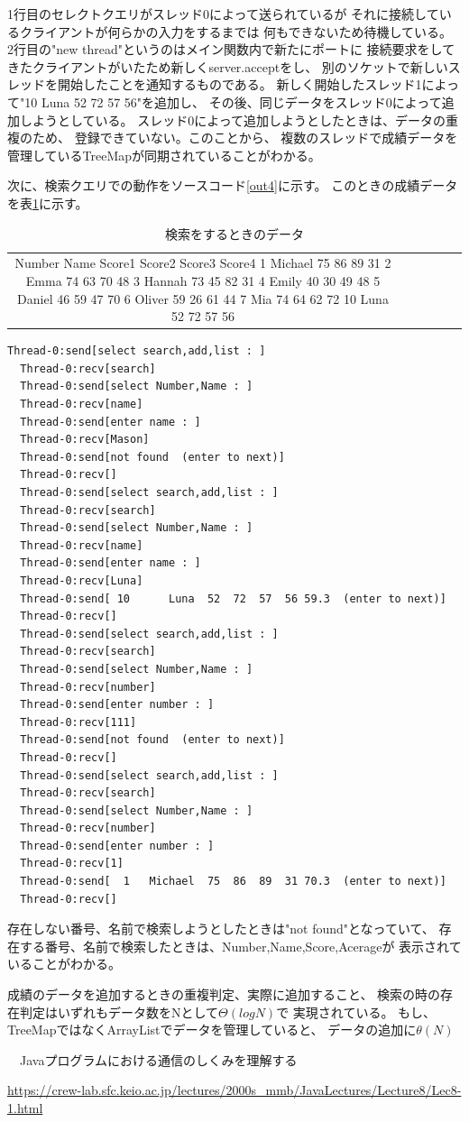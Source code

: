 \documentclass[dvipdfmx]{jsarticle}
\begin{document}
1行目のセレクトクエリがスレッド0によって送られているが
それに接続しているクライアントが何らかの入力をするまでは
何もできないため待機している。
2行目の"new thread"というのはメイン関数内で新たにポートに
接続要求をしてきたクライアントがいたため新しくserver.acceptをし、
別のソケットで新しいスレッドを開始したことを通知するものである。
新しく開始したスレッド1によって"10 Luna 52 72 57 56"を追加し、
その後、同じデータをスレッド0によって追加しようとしている。
スレッド0によって追加しようとしたときは、データの重複のため、
登録できていない。このことから、
複数のスレッドで成績データを管理しているTreeMapが同期されていることがわかる。

次に、検索クエリでの動作をソースコード\ref{out4}に示す。
このときの成績データを表\ref{data2}に示す。
\begin{table}[H]
  \begin{tabular}{cccccc}
    Number  Name  Score1  Score2  Score3  Score4
    1	Michael	75	86	89	31
    2	Emma	74	63	70	48
    3	Hannah	73	45	82	31
    4	Emily	40	30	49	48
    5	Daniel	46	59	47	70
    6	Oliver	59	26	61	44
    7	Mia	74	64	62	72
    10	Luna	52	72	57	56
  \end{tabular}
  \centering
  \caption{検索をするときのデータ}
  \label{data2}
\end{table}
\begin{lstlisting}[caption=検索クエリ,label=out4]
  Thread-0:send[select search,add,list : ]
  Thread-0:recv[search]
  Thread-0:send[select Number,Name : ]
  Thread-0:recv[name]
  Thread-0:send[enter name : ]
  Thread-0:recv[Mason]
  Thread-0:send[not found  (enter to next)]
  Thread-0:recv[]
  Thread-0:send[select search,add,list : ]
  Thread-0:recv[search]
  Thread-0:send[select Number,Name : ]
  Thread-0:recv[name]
  Thread-0:send[enter name : ]
  Thread-0:recv[Luna]
  Thread-0:send[ 10      Luna  52  72  57  56 59.3  (enter to next)]
  Thread-0:recv[]
  Thread-0:send[select search,add,list : ]
  Thread-0:recv[search]
  Thread-0:send[select Number,Name : ]
  Thread-0:recv[number]
  Thread-0:send[enter number : ]
  Thread-0:recv[111]
  Thread-0:send[not found  (enter to next)]
  Thread-0:recv[]
  Thread-0:send[select search,add,list : ]
  Thread-0:recv[search]
  Thread-0:send[select Number,Name : ]
  Thread-0:recv[number]
  Thread-0:send[enter number : ]
  Thread-0:recv[1]
  Thread-0:send[  1   Michael  75  86  89  31 70.3  (enter to next)]
  Thread-0:recv[]  
\end{lstlisting}

存在しない番号、名前で検索しようとしたときは"not found"となっていて、
存在する番号、名前で検索したときは、Number,Name,Score,Acerageが
表示されていることがわかる。

成績のデータを追加するときの重複判定、実際に追加すること、
検索の時の存在判定はいずれもデータ数をNとして$\Theta(logN)$で
実現されている。
もし、TreeMapではなくArrayListでデータを管理していると、
データの追加に$\theta(N)$

\begin{thebibliography}{10}
  　Javaプログラムにおける通信のしくみを理解する

  \url{https://crew-lab.sfc.keio.ac.jp/lectures/2000s_mmb/JavaLectures/Lecture8/Lec8-1.html}
\end{thebibliography}
\end{document}

